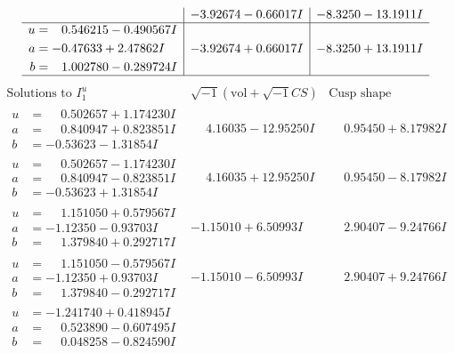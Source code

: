 \documentclass[1p]{elsarticle_modified}
\theoremstyle{definition}
\newcommand{\I}{\sqrt{-1}}
\begin{document}
$$\begin{array}{c|c|c}
 & -3.92674 - 0.66017 I & -8.3250 - 13.1911 I \\ \hline\begin{aligned}
u &= \phantom{-}0.546215 - 0.490567 I \\
a &= -0.47633 + 2.47862 I \\
b &= \phantom{-}1.002780 - 0.289724 I\end{aligned}
 & -3.92674 + 0.66017 I & -8.3250 + 13.1911 I\\
 \hline 
 \end{array}$$\newpage$$\begin{array}{c|c|c}  
\text{Solutions to }I^u_{1}& \I (\text{vol} + \sqrt{-1}CS) & \text{Cusp shape}\\
 \hline 
\begin{aligned}
u &= \phantom{-}0.502657 + 1.174230 I \\
a &= \phantom{-}0.840947 + 0.823851 I \\
b &= -0.53623 - 1.31854 I\end{aligned}
 & \phantom{-}4.16035 - 12.95250 I & \phantom{-}0.95450 + 8.17982 I \\ \hline\begin{aligned}
u &= \phantom{-}0.502657 - 1.174230 I \\
a &= \phantom{-}0.840947 - 0.823851 I \\
b &= -0.53623 + 1.31854 I\end{aligned}
 & \phantom{-}4.16035 + 12.95250 I & \phantom{-}0.95450 - 8.17982 I \\ \hline\begin{aligned}
u &= \phantom{-}1.151050 + 0.579567 I \\
a &= -1.12350 - 0.93703 I \\
b &= \phantom{-}1.379840 + 0.292717 I\end{aligned}
 & -1.15010 + 6.50993 I & \phantom{-}2.90407 - 9.24766 I \\ \hline\begin{aligned}
u &= \phantom{-}1.151050 - 0.579567 I \\
a &= -1.12350 + 0.93703 I \\
b &= \phantom{-}1.379840 - 0.292717 I\end{aligned}
 & -1.15010 - 6.50993 I & \phantom{-}2.90407 + 9.24766 I \\ \hline\begin{aligned}
u &= -1.241740 + 0.418945 I \\
a &= \phantom{-}0.523890 - 0.607495 I \\
b &= \phantom{-}0.048258 - 0.824590 I\end{aligned}

\end{array}$$
\end{document}
